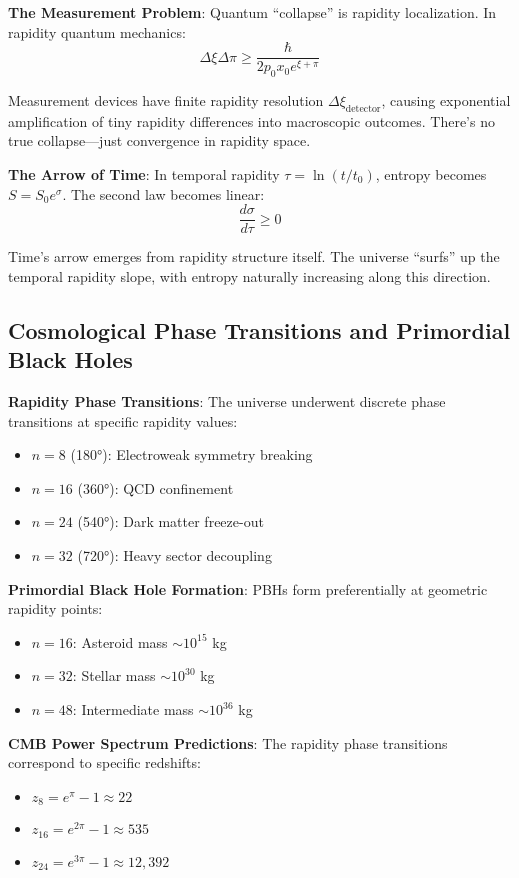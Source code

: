 \documentclass[12pt,a4paper]{article}
\begin{document}
\textbf{The Measurement Problem}:
Quantum ``collapse'' is rapidity localization. In rapidity quantum mechanics:
\begin{equation}
\Delta\xi \Delta\pi \geq \frac{\hbar}{2p_0 x_0 e^{\xi + \pi}}
\end{equation}

Measurement devices have finite rapidity resolution $\Delta\xi_{\text{detector}}$, causing exponential amplification of tiny rapidity differences into macroscopic outcomes. There's no true collapse—just convergence in rapidity space.

\textbf{The Arrow of Time}:
In temporal rapidity $\tau = \ln(t/t_0)$, entropy becomes $S = S_0 e^{\sigma}$. The second law becomes linear:
\begin{equation}
\frac{d\sigma}{d\tau} \geq 0
\end{equation}

Time's arrow emerges from rapidity structure itself. The universe ``surfs'' up the temporal rapidity slope, with entropy naturally increasing along this direction.

\subsection{Cosmological Phase Transitions and Primordial Black Holes}

\textbf{Rapidity Phase Transitions}:
The universe underwent discrete phase transitions at specific rapidity values:
\begin{itemize}
\item $n = 8$ (180°): Electroweak symmetry breaking
\item $n = 16$ (360°): QCD confinement  
\item $n = 24$ (540°): Dark matter freeze-out
\item $n = 32$ (720°): Heavy sector decoupling
\end{itemize}

\textbf{Primordial Black Hole Formation}:
PBHs form preferentially at geometric rapidity points:
\begin{itemize}
\item $n = 16$: Asteroid mass $\sim 10^{15}$ kg
\item $n = 32$: Stellar mass $\sim 10^{30}$ kg  
\item $n = 48$: Intermediate mass $\sim 10^{36}$ kg
\end{itemize}

\textbf{CMB Power Spectrum Predictions}:
The rapidity phase transitions correspond to specific redshifts:
\begin{itemize}
\item $z_8 = e^{\pi} - 1 \approx 22$
\item $z_{16} = e^{2\pi} - 1 \approx 535$  
\item $z_{24} = e^{3\pi} - 1 \approx 12,392$
\end{itemize}
\end{document}
